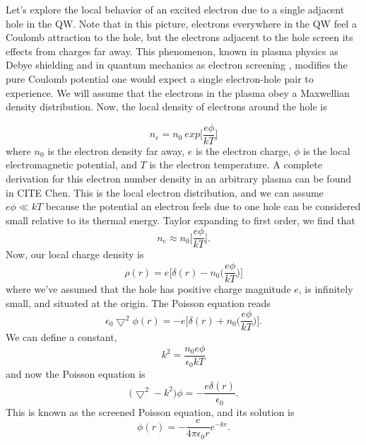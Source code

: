 \indent Let's explore the local behavior of an excited electron due to a single adjacent hole in the QW. Note that in this picture, electrons everywhere in the QW feel a Coulomb attraction to the hole, but the electrons adjacent to the hole screen its effects from charges far away. This phenomenon, known in plasma physics as Debye shielding \cite{chen} and in quantum mechanics as electron screening \cite{griffiths}, modifies the pure Coulomb potential one would expect a single electron-hole pair to experience. We will assume that the electrons in the plasma obey a Maxwellian density distribution. Now, the local density of electrons around the hole is 

\begin{equation}
n_e = n_{0}~ exp \Big[ \frac{e\phi}{k T}\Big]
\end{equation}
where $n_{0}$ is the electron density far away, $e$ is the electron charge, $\phi$ is the local electromagnetic potential, and  $T$ is the electron temperature. A complete derivation for this electron number density in an arbitrary plasma can be found in CITE Chen. This is the local electron distribution, and we can assume $e\phi \ll kT$ because the potential an electron feels due to one hole can be considered small relative to its thermal energy. Taylor expanding to first order, we find that
\begin{equation}
n_e \approx n_0 \Big[ \frac{e\phi}{k T}\Big ].
\end{equation}
Now, our local charge density is 
\begin{equation}
\rho(r) = e \Big [ \delta(r) - n_0 \Big( \frac{e\phi}{k T}\Big ) \Big]
\end{equation}
where we've assumed that the hole has positive charge magnitude $e$, is infinitely small, and situated at the origin. The Poisson equation reads
\begin{equation} \label{pois}
\epsilon_0 \bigtriangledown^2 \phi(r) = -e \Big [ \delta(r) + n_0 \Big( \frac{e\phi}{k T}\Big ) \Big].
\end{equation}
We can define a constant, 
\begin{equation}
k^2 = \frac{n_0 e\phi}{\epsilon_0 k T}
\end{equation}
and now the Poisson equation is
\begin{equation}
\big(\bigtriangledown^2 - k^2 \big) \phi = - \frac{e \delta(r)}{\epsilon_0}.
\end{equation}
This is known as the screened Poisson equation, and its solution is
\begin{equation}
\phi(r) = -\frac{e}{4\pi \epsilon_0 r} e^{-k r}.
\end{equation}
